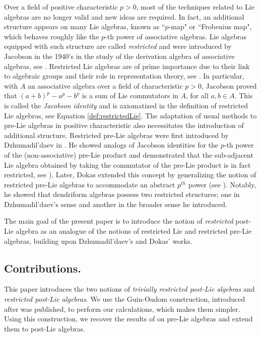\documentclass[12pt]{article}
\begin{document}
Over a field of positive characteristic $p>0$, most of the techniques related to Lie algebras are no longer valid and new ideas are required. In fact, an additional structure appears on many Lie algebras, known as ``$p$-map" or ``Frobenius map", which behaves roughly like the $p$-th power of associative algebras. Lie algebras equipped with such structure are called \textit{restricted} and were introduced by Jacobson in the 1940's in the study of the derivation algebra of associative algebras, see \cite{J}. Restricted Lie algebras are of prime importance due to their link to algebraic groups and their role in representation theory, see \cite{SF}. In particular, with $A$ an associative algebra over a field of characteristic $p>0$, Jacobson proved that $(a+b)^{p} - a^p - b^p$ is a sum of Lie commutators in $A$, for all $a,b\in A$. This is called the \emph{Jacobson identity} and is axiomatized in the definition of restricted Lie algebras, see Equation \eqref{def:restrictedLie}. The adaptation of usual methods to pre-Lie algebras in positive characteristic also necessitates the introduction of additional structure. Restricted pre-Lie algebras were first introduced by Dzhumadil'daev in \cite{asqar}. He showed analogs of Jacobson identities for the $p$-th power of the (non-associative) pre-Lie product and demonstrated that the sub-adjacent Lie algebra obtained by taking the commutator of the pre-Lie product is in fact restricted, see \cite[Theorem 1.1]{asqar}).  Later, Dokas extended this concept by generalizing the notion of restricted pre-Lie algebras to accommodate an abstract $p^{th}$ power (see \cite[Definition 2.3]{Do}). Notably, he showed that dendriform algebras possess two restricted structures; one in Dzhumadil’daev’s sense and another in the broader sense he introduced.

The main goal of the present paper is to introduce the notion of \textit{restricted} post-Lie algebra as an analogue of the notions of restricted Lie and restricted pre-Lie algebras, building upon Dzhumadil’daev's and Dokas' works.



\subsection{Contributions.}
This paper introduces the two notions of \emph{trivially restricted post-Lie algebras} and \emph{restricted post-Lie algebras}. We use the Guin-Oudom construction, introduced after \cite{asqar} was published, to perform our calculations, which makes them simpler. Using this construction, we recover the results of \cite{asqar} on pre-Lie algebras and extend them to post-Lie algebras. 
\end{document}

